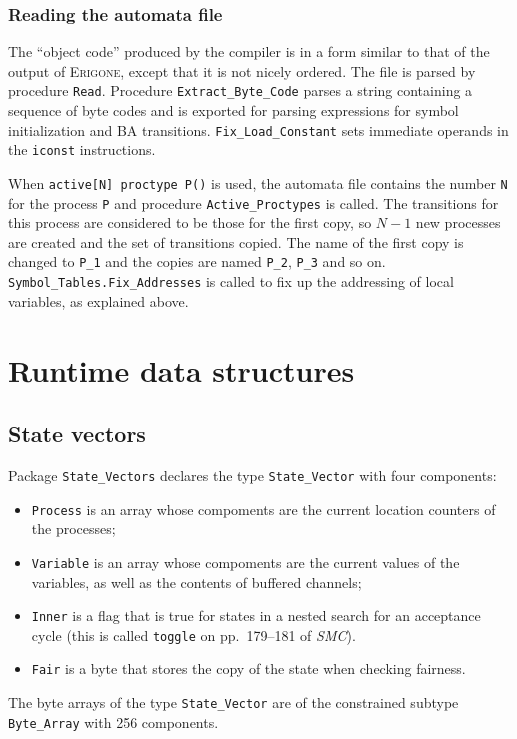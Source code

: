 \documentclass[11pt]{article}
\newcommand*{\prg}{\textsc{Erigone}}
\newcommand*{\smc}{\textit{SMC}}
\newcommand*{\p}[1]{\texttt{#1}}
\begin{document}
\subsubsection*{Reading the automata file}
The ``object code'' produced by the compiler is in a form similar to
that of the output of \prg{}, except that it is not nicely ordered. The
file is parsed by procedure \p{Read}. Procedure \p{Extract\_Byte\_Code}
parses a string containing a sequence of byte codes and is exported for
parsing expressions for symbol initialization and BA transitions.
\p{Fix\_Load\_Constant} sets immediate operands in the \p{iconst}
instructions.

When \p{active[N] proctype P()} is used, the automata file contains the
number \p{N} for the process \p{P} and procedure \p{Active\_Proctypes}
is called. The transitions for this process are considered to be those
for the first copy, so $N-1$ new processes are created and the set of
transitions copied. The name of the first copy is changed to \p{P\_1}
and the copies are named \p{P\_2}, \p{P\_3} and so on.
\p{Symbol\_Tables.Fix\_Addresses} is called to fix up the addressing of
local variables, as explained above.

\section{Runtime data structures}

\subsection{State vectors}
Package \p{State\_Vectors} declares the type \p{State\_Vector} with four
components:
\begin{itemize}
\item \p{Process} is an array whose compoments are the current location
counters of the processes;
\item \p{Variable} is an array whose compoments are the current values of
the variables, as well as the contents of buffered channels;
\item \p{Inner} is a flag that is true for states in a nested search for
an acceptance cycle (this is called \p{toggle} on pp.~179--181 of
\smc{}).
\item \p{Fair} is a byte that stores the copy of the state when checking fairness.
\end{itemize}
The byte arrays of the type \p{State\_Vector} are of the constrained
subtype \p{Byte\_Array} with 256 components.
\end{document}
